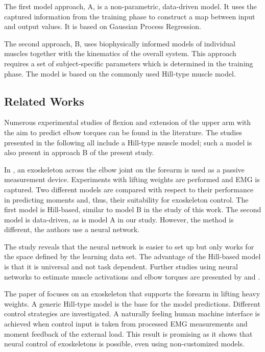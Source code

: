 The first model approach, A, is a non-parametric, data-driven model. It uses the captured information from the training phase to construct a map between input and output values. It is based on Gaussian Process Regression.

The second approach, B, uses biophysically informed models of individual muscles together with the kinematics of the overall system. This approach requires a set of subject-specific parameters which is determined in the training phase. The model is based on the commonly used Hill-type muscle model.

\subsection{Related Works}

%
Numerous experimental studies of flexion and extension of the upper arm with the aim to predict elbow torques can be found in the literature. The studies presented in the following all include a Hill-type muscle model; such a model is also present in approach B of the present study.

In \cite{Rosen1999}, an exoskeleton across the elbow joint on the forearm is used as a passive measurement device. Experiments with lifting weights are performed and EMG is captured.
Two different models are compared with respect to their performance in predicting moments and, thus, their suitability for exoskeleton control.
The first model is Hill-based, similar to model B in the study of this work.
The second model is data-driven, as is model A in our study. However, the method is different, the authors use a neural network.

The study reveals that the neural network is easier to set up but only works for the space defined by the learning data set. The advantage of the Hill-based model is that it is universal and not task dependent. 
Further studies using neural networks to estimate muscle activations and elbow torques are presented by \cite{Wang2002} and \cite{Song2005}.
%

The paper of \cite{Rosen2001} focuses on an exoskeleton that supports the forearm in lifting heavy weights. A generic Hill-type model is the base for the model predictions. Different control strategies are investigated. 
A naturally feeling human machine interface is achieved when
control input is taken from processed EMG measurements and moment feedback of the external load. 
This result is promising as it shows that neural control of exoskeletons is possible, even using non-customized models. 

